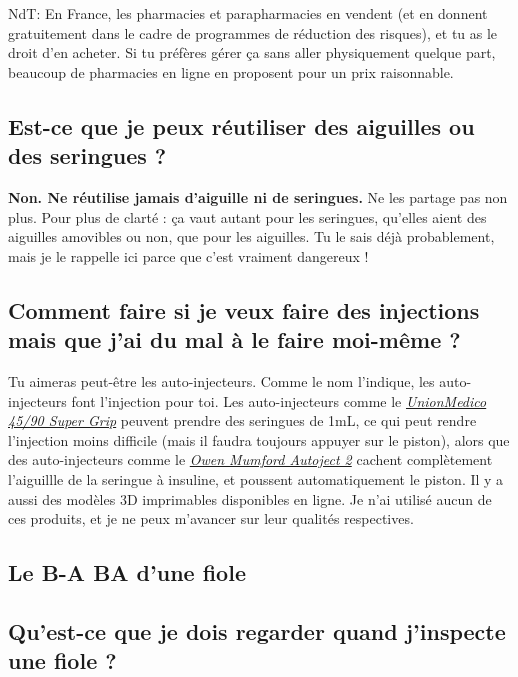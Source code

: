 \documentclass{article}
\begin{document}
NdT: En France, les pharmacies et parapharmacies en vendent (et en donnent gratuitement dans le cadre de programmes de réduction des risques), et tu as le droit d'en acheter. Si tu préfères gérer ça sans aller physiquement quelque part, beaucoup de pharmacies en ligne en proposent pour un prix raisonnable.

\subsection{Est-ce que je peux réutiliser des aiguilles ou des seringues ?}

\textbf{Non. Ne réutilise jamais d'aiguille ni de seringues.} Ne les partage pas non plus. Pour plus de clarté : ça vaut autant pour les seringues, qu'elles aient des aiguilles amovibles ou non, que pour les aiguilles. Tu le sais déjà probablement, mais je le rappelle ici parce que c'est vraiment dangereux !

\subsection{Comment faire si je veux faire des injections mais que j'ai du mal à le faire moi-même ?}\label{5-21}

Tu aimeras peut-être les auto-injecteurs. Comme le nom l'indique, les auto-injecteurs font l'injection pour toi. Les auto-injecteurs comme le \href{https://unionmedico.com/90-super-grip/}{\textit{UnionMedico 45/90 Super Grip}} peuvent prendre des seringues de 1mL, ce qui peut rendre l'injection moins difficile (mais il faudra toujours appuyer sur le piston), alors que des auto-injecteurs comme le \href{https://www.youtube.com/watch?v=hPbhEpUN43Y}{\textit{Owen Mumford Autoject 2}} cachent complètement l'aiguillle de la seringue à insuline, et poussent automatiquement le piston. Il y a aussi des modèles 3D imprimables disponibles en ligne. Je n'ai utilisé aucun de ces produits, et je ne peux m'avancer sur leur qualités respectives.

\subsection*{Le B-A BA d'une fiole}

\subsection{Qu'est-ce que je dois regarder quand j'inspecte une fiole ?}
\end{document}
